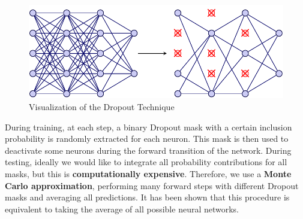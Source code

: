 \begin{figure}[!htbp]
    \centering
    \includegraphics[width = \linewidth]{tikz/chapter4 - Dropout.pdf}
    \caption{Visualization of the Dropout Technique}
\end{figure}

During training, at each step, a binary Dropout mask with a certain inclusion probability is randomly extracted for each neuron. This mask is then used to deactivate some neurons during the forward transition of the network. During testing, ideally we would like to integrate all probability contributions for all masks, but this is \textbf{computationally expensive}. Therefore, we use a \textbf{Monte Carlo approximation}, performing many forward steps with different Dropout masks and averaging all predictions. It has been shown that this procedure is equivalent to taking the average of all possible neural networks.

